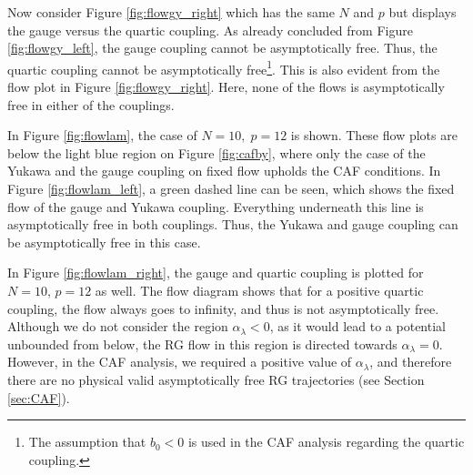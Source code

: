 Now consider Figure \ref{fig:flowgy_right} which has the same $N$ and $p$ but displays the gauge versus the quartic coupling. As already concluded from Figure \ref{fig:flowgy_left}, the gauge coupling cannot be asymptotically free. Thus, the quartic coupling cannot be asymptotically free\footnote{The assumption that $b_0<0$ is used in the CAF analysis regarding the quartic coupling. }. This is also evident from the flow plot in Figure \ref{fig:flowgy_right}. Here, none of the flows is asymptotically free in either of the couplings. 

In Figure \ref{fig:flowlam}, the case of $N=10,\;p=12$ is shown. These flow plots are below the light blue region on Figure \ref{fig:cafby}, where only the case of the Yukawa and the gauge coupling on fixed flow upholds the CAF conditions. In Figure \ref{fig:flowlam_left}, a green dashed line can be seen, which shows the fixed flow of the gauge and Yukawa coupling. Everything underneath this line is asymptotically free in both couplings. Thus, the Yukawa and gauge coupling can be asymptotically free in this case. 

In Figure \ref{fig:flowlam_right}, the gauge and quartic coupling is plotted for $N=10$, $p=12$ as well. The flow diagram shows that for a positive quartic coupling, the flow always goes to infinity, and thus is not asymptotically free. Although we do not consider the region $\alpha_\lambda<0$, as it would lead to a potential unbounded from below, the RG flow in this region is directed towards $\alpha_\lambda=0$. However, in the CAF analysis, we required a positive value of $\alpha_\lambda$, and therefore there are no physical valid asymptotically free RG trajectories (see Section \ref{sec:CAF}).

